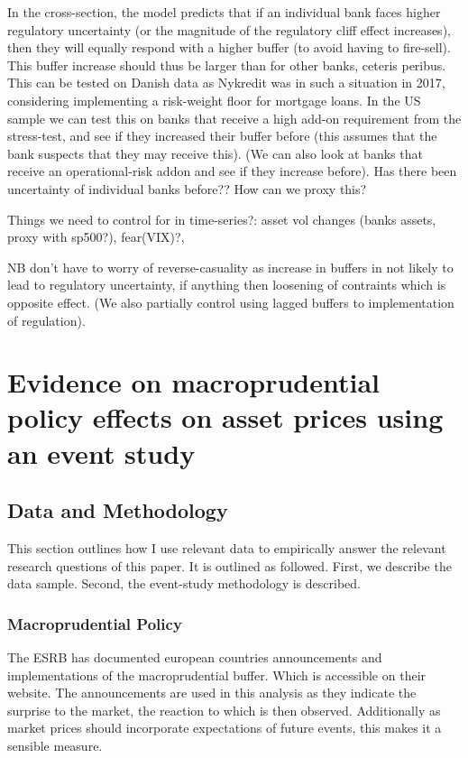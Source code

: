 \documentclass[11pt]{article}
\begin{document}
In the cross-section, the model predicts that if an individual bank faces higher regulatory uncertainty (or the magnitude of the regulatory cliff effect increases), then they will equally respond with a higher buffer (to avoid having to fire-sell). This buffer increase should thus be larger than for other banks, ceteris peribus. This can be tested on Danish data as Nykredit was in such a situation in 2017, considering implementing a risk-weight floor for mortgage loans. In the US sample we can test this on banks that receive a high add-on requirement from the stress-test, and see if they increased their buffer before (this assumes that the bank suspects that they may receive this). (We can also look at banks that receive an operational-risk addon and see if they increase before). Has there been uncertainty of individual banks before?? How can we proxy this?

Things we need to control for in time-series?: asset vol changes (banks assets, proxy with sp500?), fear(VIX)?,

NB don't have to worry of reverse-casuality as increase in buffers in not likely to lead to regulatory uncertainty, if anything then loosening of contraints which is opposite effect. (We also partially control using lagged buffers to implementation of regulation).



\section{Evidence on macroprudential policy effects on asset prices using an event study} \label{sec:empiricalAnalysis}

\subsection{Data and Methodology}

This section outlines how I use relevant data to empirically answer the relevant research questions of this paper. It is outlined as followed. First, we describe the data sample. Second, the event-study methodology is described.

\subsubsection*{Macroprudential Policy}
The ESRB has documented european countries announcements and implementations of the macroprudential buffer. Which is accessible on their website. The announcements are used in this analysis as they indicate the surprise to the market, the reaction to which is then observed. Additionally as market prices should incorporate expectations of future events, this makes it a sensible measure.
\end{document}
